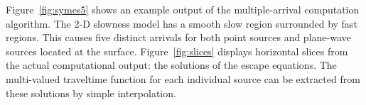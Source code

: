 Figure~\ref{fig:symes5} shows an example output of the multiple-arrival
computation algorithm. The 2-D slowness model has a smooth slow region
surrounded by fast regions. This causes five distinct arrivals for both point
sources and plane-wave sources located at the surface. Figure~\ref{fig:slices}
displays horizontal slices from the actual computational output: the solutions
of the escape equations. The multi-valued traveltime function for each
individual source can be extracted from these solutions by simple
interpolation.


